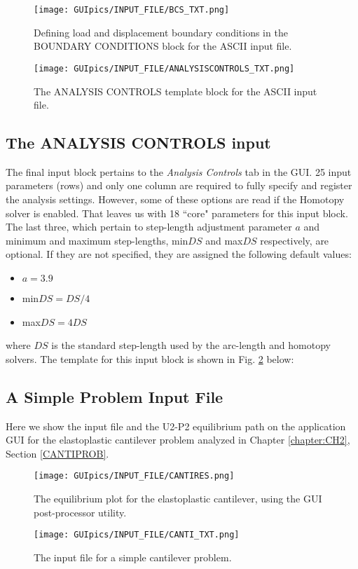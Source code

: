 \begin{figure}[t]
	\centering
	\texttt{[image: GUIpics/INPUT\_FILE/BCS\_TXT.png]}
	\caption{Defining load and displacement boundary conditions in the BOUNDARY 
	CONDITIONS block for the ASCII input file.}
	\label{fig:BCS}
\end{figure}

\begin{figure}[t]
	\centering
	\texttt{[image: GUIpics/INPUT\_FILE/ANALYSISCONTROLS\_TXT.png]}
	\caption{The ANALYSIS CONTROLS template block for the ASCII input file.}
	\label{fig:ANALYSIS}
\end{figure}

\subsection{The ANALYSIS CONTROLS input}
The final input block pertains to the \textit{Analysis Controls} tab in the 
GUI. 25 input parameters (rows) and only one column are required to fully 
specify and register the analysis settings. However, some of these options are 
read if the Homotopy solver is enabled. That leaves us with 18 ``core" 
parameters for this input block. The last three, which pertain to step-length 
adjustment parameter $a$ and minimum and maximum step-lengths, min$DS$ and 
max$DS$ respectively, are optional. If they are not specified, they are 
assigned the following default values:
\begin{itemize}
	\item $a=3.9$
	\item min$DS = DS/4$
	\item max$DS = 4DS$
\end{itemize}

\noindent where $DS$ is the standard step-length used by the arc-length and 
homotopy solvers. The template for this input block is shown in Fig. 
\ref{fig:ANALYSIS} below:

\subsection{A Simple Problem Input File}

Here we show the input file and the U2-P2 equilibrium path on the application 
GUI for the elastoplastic cantilever problem analyzed in Chapter 
\ref{chapter:CH2}, Section \ref{CANTIPROB}.
\begin{figure}
	\centering
	\texttt{[image: GUIpics/INPUT\_FILE/CANTIRES.png]}
	\caption{The equilibrium plot for the elastoplastic cantilever, using the 
		GUI post-processor utility.}
	\label{fig:RES}
\end{figure}

\begin{figure}
	\centering
	\texttt{[image: GUIpics/INPUT\_FILE/CANTI\_TXT.png]}
	\caption{The input file for a simple cantilever problem.}
	\label{fig:CANTINPUT}
\end{figure}

